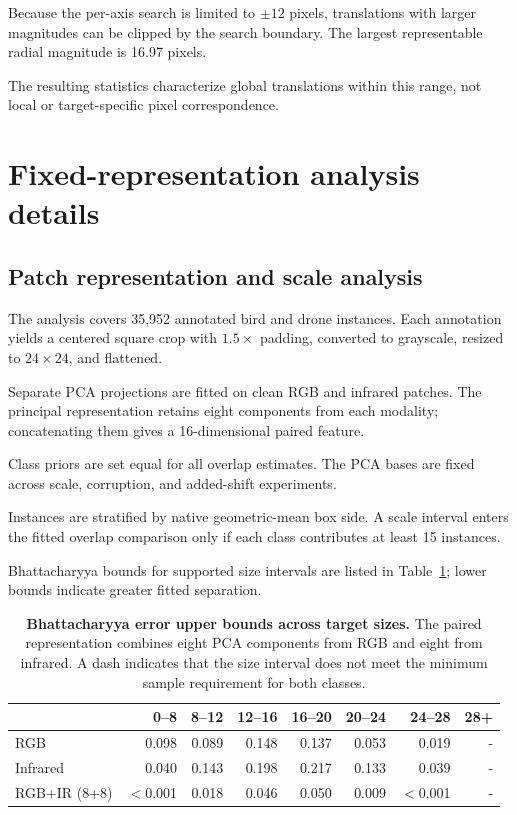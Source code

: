 \documentclass[10pt]{article}
\begin{document}
Because the per-axis search is limited to $\pm12$ pixels, translations with larger magnitudes can be clipped by the search boundary. The largest representable radial magnitude is 16.97 pixels.

The resulting statistics characterize global translations within this range, not local or target-specific pixel correspondence.


\section{Fixed-representation analysis details}
\label{app:intrinsic}

\subsection{Patch representation and scale analysis}

The analysis covers 35,952 annotated bird and drone instances. Each annotation yields a centered square crop with $1.5\times$ padding, converted to grayscale, resized to $24\times24$, and flattened.

Separate PCA projections are fitted on clean RGB and infrared patches. The principal representation retains eight components from each modality; concatenating them gives a 16-dimensional paired feature.

Class priors are set equal for all overlap estimates. The PCA bases are fixed across scale, corruption, and added-shift experiments.

Instances are stratified by native geometric-mean box side. A scale interval enters the fitted overlap comparison only if each class contributes at least 15 instances.

Bhattacharyya bounds for supported size intervals are listed in Table~\ref{tab:scalebounds}; lower bounds indicate greater fitted separation.

\begin{table}[h]
\centering
\caption{\textbf{Bhattacharyya error upper bounds across target sizes.}
The paired representation combines eight PCA components from RGB and eight from infrared. A dash indicates that the size interval does not meet the minimum sample requirement for both classes.}
\label{tab:scalebounds}
\small
\begin{tabular}{lrrrrrrr}
\toprule
& 0--8 & 8--12 & 12--16 & 16--20 & 20--24 & 24--28 & 28+ \\
\midrule
RGB
& 0.098 & 0.089 & 0.148 & 0.137 & 0.053 & 0.019 & - \\
Infrared
& 0.040 & 0.143 & 0.198 & 0.217 & 0.133 & 0.039 & - \\
RGB+IR (8+8)
& $<$0.001 & 0.018 & 0.046 & 0.050 & 0.009 & $<$0.001 & - \\
\bottomrule
\end{tabular}
\end{table}
\end{document}
